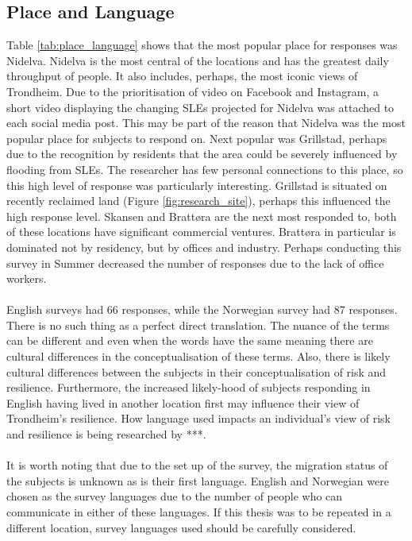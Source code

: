 \subsection{Place and Language}
Table \ref{tab:place_language} shows that the most popular place for responses was Nidelva. Nidelva is the most central of the locations and has the greatest daily throughput of people. It also includes, perhaps, the most iconic views of Trondheim. Due to the prioritisation of video on Facebook and Instagram, a short video displaying the changing SLEs projected for Nidelva was attached to each social media post. This may be part of the reason that Nidelva was the most popular place for subjects to respond on.  Next popular was Grillstad, perhaps due to the recognition by residents that the area could be severely influenced by flooding from SLEs. The researcher has few personal connections to this place, so this high level of response was particularly interesting. Grillstad is situated on recently reclaimed land (Figure \ref{fig:research_site}), perhaps this influenced the high response level. Skansen and Brattøra are the next most responded to, both of these locations have significant commercial ventures. Brattøra in particular is dominated not by residency, but by offices and industry. Perhaps conducting this survey in Summer decreased the number of responses due to the lack of office workers. 
\paragraph{}
English surveys had 66 responses, while the Norwegian survey had 87 responses. There is no such thing as a perfect direct translation. The nuance of the terms can be different and even when the words have the same meaning there are cultural differences in the conceptualisation of these terms. Also, there is likely cultural differences between the subjects in their conceptualisation of risk and resilience. Furthermore, the increased likely-hood of subjects responding in English having lived in another location first may influence their view of Trondheim's resilience. How language used impacts an individual's view of risk and resilience is being researched by ***.

\paragraph{}
It is worth noting that due to the set up of the survey, the migration status of the subjects is unknown as is their first language. English and Norwegian were chosen as the survey languages due to the number of people who can communicate in either of these languages. If this thesis was to be repeated in a different location, survey languages used should be carefully considered.


